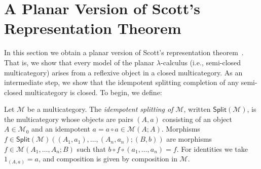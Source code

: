 \documentclass{llncs}
\begin{document}
\section{A Planar Version of Scott's Representation Theorem}\label{sec:planar-scott}
In this section we obtain a planar version of Scott's representation theorem~\cite{Scott1980}. That is, we show that every model of the planar $\lambda$-calculus (i.e., semi-closed multicategory) arises from a reflexive object in a closed multicategory. As an intermediate step, we show that the idempotent splitting completion of any semi-closed multicategory is closed. To begin, we define:
\begin{definition}\label{def:multi-idempotent-splitting}
  Let $\mathcal{M}$ be a multicategory. The \emph{idempotent splitting of $\mathcal{M}$}, written $\mathsf{Split}(\mathcal{M})$, is the multicategory whose objects are pairs $(A,a)$ consisting of an object $A \in \mathcal{M}_0$ and an idempotent $a = a \circ a \in \mathcal{M}(A;A)$. Morphisms $f \in \mathsf{Split}(\mathcal{M})((A_1,a_1),\ldots,(A_n,a_n);(B,b))$ are morphisms $f \in \mathcal{M}(A_1,\ldots,A_n;B)$ such that $b \circ f \circ (a_1,\ldots,a_n) = f$. For identities we take $1_{(A,a)} = a$, and composition is given by composition in $\mathcal{M}$. 
\end{definition}
\end{document}
